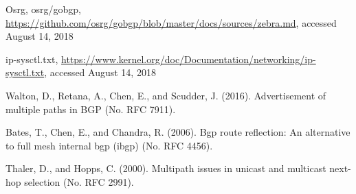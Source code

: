 \begin{thebibliography}{99}
Osrg, osrg/gobgp, \url{https://github.com/osrg/gobgp/blob/master/docs/sources/zebra.md}, accessed August 14, 2018

ip-sysctl.txt, \url{https://www.kernel.org/doc/Documentation/networking/ip-sysctl.txt}, accessed August 14, 2018

Walton, D., Retana, A., Chen, E., and Scudder, J. (2016). Advertisement of multiple paths in BGP (No. RFC 7911).

Bates, T., Chen, E., and  Chandra, R. (2006). Bgp route reflection: An alternative to full mesh internal bgp (ibgp) (No. RFC 4456).

Thaler, D., and Hopps, C. (2000). Multipath issues in unicast and multicast next-hop selection (No. RFC 2991).

\end{thebibliography}
